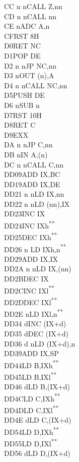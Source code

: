 \documentclass[12pt,twoside,openright,a4paper]{book}
\newcommand{\UNDOC}{\textnormal{\textsuperscript{**}}}
\begin{document}
\begin{multicols}{3}
{\begin{tabbing}
	CC n n\>CALL Z,nn\\
	CD n n\>CALL nn\\
	CE n\>ADC A,n\\
	CF\>RST 8H\\
	D0\>RET NC\\
	D1\>POP DE\\
	D2 n n\>JP NC,nn\\
	D3 n\>OUT (n),A\\
	D4 n n\>CALL NC,nn\\
	D5\>PUSH DE\\
	D6 n\>SUB n\\
	D7\>RST 10H\\
	D8\>RET C\\
	D9\>EXX\\
	DA n n\>JP C,nn\\
	DB n\>IN A,(n)\\
	DC n n\>CALL C,nn\\
	DD09\>ADD IX,BC\\
	DD19\>ADD IX,DE\\
	DD21 n n\>LD IX,nn\\
	DD22 n n\>LD (nn),IX\\
	DD23\>INC IX\\
	DD24\>INC IXh\UNDOC\\
	DD25\>DEC IXh\UNDOC\\
	DD26 n \>LD IXh,n\UNDOC\\
	DD29\>ADD IX,IX\\
	DD2A n n\>LD IX,(nn)\\
	DD2B\>DEC IX\\
	DD2C\>INC IXl\UNDOC\\
	DD2D\>DEC IXl\UNDOC\\
	DD2E n\>LD IXl,n\UNDOC\\
	DD34 d\>INC (IX+d)\\
	DD35 d\>DEC (IX+d)\\
	DD36 d n\>LD (IX+d),n\\
	DD39\>ADD IX,SP\\
	DD44\>LD B,IXh\UNDOC\\
	DD45\>LD B,IXl\UNDOC\\
	DD46 d\>LD B,(IX+d)\\
	DD4C\>LD C,IXh\UNDOC\\
	DD4D\>LD C,IXl\UNDOC\\
	DD4E d\>LD C,(IX+d)\\
	DD54\>LD D,IXh\UNDOC\\
	DD55\>LD D,IXl\UNDOC\\
	DD56 d\>LD D,(IX+d)\\

\end{tabbing}}
\end{multicols}
\end{document}
